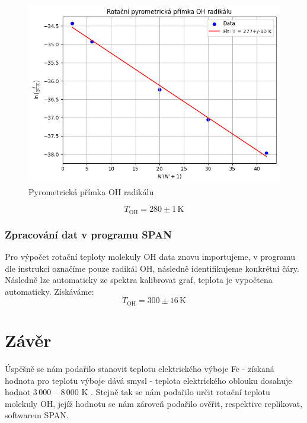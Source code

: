 \documentclass[czech,11pt,a4paper]{article}
\begin{document}
\begin{multicols}{2}
		\begin{figure}[H]
			\centering
			\includegraphics[width=0.9\linewidth]{pyrometrika2}
			\caption{Pyrometrická přímka OH radikálu}			
		\end{figure}
		\begin{equation*}
			T_{\mathrm{OH}} = 280 \pm 1 \,\mathrm{K}
		\end{equation*}
		\subsubsection{Zpracování dat v programu SPAN}
		
		Pro výpočet rotační teploty molekuly OH data znovu importujeme, v programu dle instrukcí označíme pouze radikál OH, následně identifikujeme konkrétní čáry. Následně lze automaticky ze spektra kalibrovat graf, teplota je vypočtena automaticky. Získáváme:
		\begin{equation*}
			T_{\mathrm{OH}}= 300 \pm 16 \,\mathrm{K}
		\end{equation*}
		
		
		
		
		\section{Závěr}
		Úspěšně se nám podařilo stanovit teplotu elektrického výboje Fe - získaná hodnota pro teplotu výboje dává smysl - teplota elektrického oblouku dosahuje hodnot 3\,000 -- 8\,000 K \cite{vut}. Stejně tak se nám podařilo určit rotační teplotu molekuly OH, jejíž hodnotu se nám zároveň podařilo ověřit, respektive replikovat, softwarem SPAN.
		
\printbibliography
\newpage

			\end{multicols}
\end{document}

